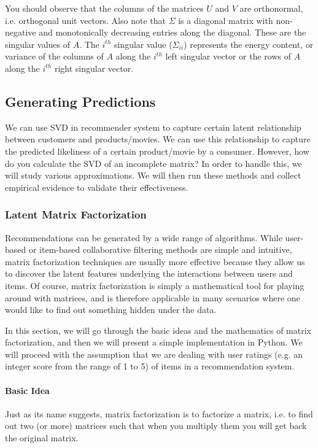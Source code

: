 You should observe that the columns of the matrices $U$ and $V$ are orthonormal, i.e. orthogonal unit vectors. Also note that $\Sigma$ is a diagonal matrix with non-negative and monotonically decreasing entries along the diagonal. These are the singular values of $A$. The $i^{th}$ singular value ($\Sigma_{ii}$) represents the energy content, or variance of the columns of $A$ along the $i^{th}$ left singular vector or the rows of $A$ along the $i^{th}$ right singular vector.
  \subsection{Generating Predictions}
  We can use SVD in recommender system to capture certain latent relationship between customers and products/movies. We can use this relationship to capture the predicted likeliness of a certain product/movie by a consumer. However, how do you calculate the SVD of an incomplete matrix? In order to handle this, we will study various approximations. We will then run these methods and collect empirical evidence to validate their effectiveness.
  \subsubsection{Latent Matrix Factorization}

Recommendations can be generated by a wide range of algorithms. While user-based or item-based collaborative filtering methods are simple and intuitive, matrix factorization techniques are usually more effective because they allow us to discover the latent features underlying the interactions between users and items. Of course, matrix factorization is simply a mathematical tool for playing around with matrices, and is therefore applicable in many scenarios where one would like to find out something hidden under the data.

In this section, we will go through the basic ideas and the mathematics of matrix factorization, and then we will present a simple implementation in Python. We will proceed with the assumption that we are dealing with user ratings (e.g. an integer score from the range of 1 to 5) of items in a recommendation system.
\paragraph{Basic Idea}
Just as its name suggests, matrix factorization is to factorize a matrix, i.e. to find out two (or more) matrices such that when you multiply them you will get back the original matrix.

